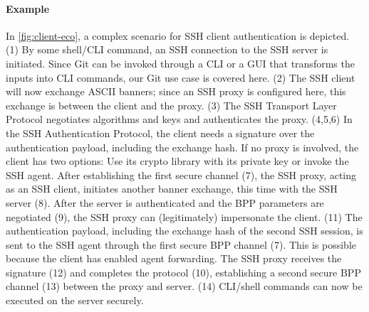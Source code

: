 \paragraph{Example}

In \autoref{fig:client-eco}, a complex scenario for SSH client authentication is depicted. (1) By some shell/CLI command, an SSH connection to the SSH server is initiated. Since Git can be invoked through a CLI or a GUI that transforms the inputs into CLI commands, our Git use case is covered here. (2) The SSH client will now exchange ASCII banners; since an SSH proxy is configured here, this exchange is between the client and the proxy. (3) The SSH Transport Layer Protocol negotiates algorithms and keys and authenticates the proxy. (4,5,6) In the SSH Authentication Protocol, the client needs a signature over the authentication payload, including the exchange hash. If no proxy is involved, the client has two options: Use its crypto library with its private key or invoke the SSH agent. After establishing the first secure channel (7), the SSH proxy, acting as an SSH client, initiates another banner exchange, this time with the SSH server (8). After the server is authenticated and the BPP parameters are negotiated (9), the SSH proxy can (legitimately) impersonate the client. (11) The authentication payload, including the exchange hash of the second SSH session, is sent to the SSH agent through the first secure BPP channel (7). This is possible because the client has enabled agent forwarding. The SSH proxy receives the signature (12) and completes the protocol (10), establishing a second secure BPP channel (13) between the proxy and server. (14) CLI/shell commands can now be executed on the server securely.
